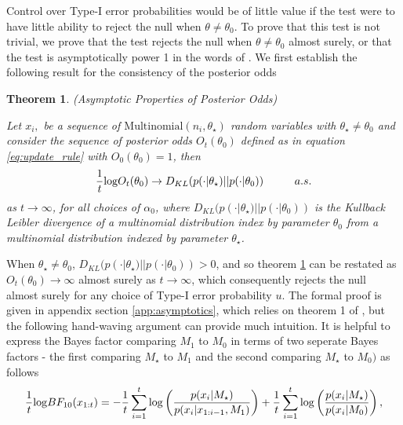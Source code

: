\documentclass[11pt]{article}
\def\log{{\rm log}}
\newtheorem{thm}{Theorem}[section]
\begin{document}
Control over Type-I error probabilities would be of little value if the test were to have little ability to reject the null when $\theta \neq \theta_0$.
To prove that this test is not trivial, we prove that the test rejects the null when $\theta \neq \theta_0$ almost surely, or that the test is asymptotically power 1 in the words of \cite{robbins}.
We first establish the following result for the consistency of the posterior odds

\begin{thm}(Asymptotic Properties of Posterior Odds)
  
  \label{thm:consistency}
\noindent Let $x_i,$ be a sequence of $\text{Multinomial}(n_i,\theta_{\star})$ random variables with $\theta_{\star} \neq \theta_0$ and consider the sequence of posterior odds $O_t(\theta_0)$ defined as in equation \eqref{eq:update_rule} with $O_0(\theta_0)=1$, then
\begin{equation}
  \label{eq:consistency}
  \frac{1}{t} \log O_t(\theta_0) \rightarrow D_{KL}(p(\cdot|\theta_{\star}) || p(\cdot|\theta_0)) \hspace{1cm} a.s.
\end{equation}
as $t \rightarrow \infty$, for all choices of $\alpha_0$, where $D_{KL}(p(\cdot|\theta_{\star}) || p(\cdot|\theta_0))$ is the Kullback Leibler divergence of a multinomial distribution index by parameter $\theta_0$ from a multinomial distribution indexed by parameter $\theta_{\star}$.

\end{thm}
\noindent When $\theta_{\star} \neq \theta_0$, $D_{KL}(p(\cdot|\theta_{\star}) || p(\cdot|\theta_0)) > 0$, and so theorem \ref{thm:consistency} can be restated as $O_t(\theta_0) \rightarrow \infty$ almost surely as $t \rightarrow \infty$, which consequently rejects the null almost surely for any choice of Type-I error probability $u$.
The formal proof is given in appendix section \ref{app:asymptotics}, which relies on theorem 1 of \cite{walker}, but the following hand-waving argument can provide much intuition.
It is helpful to express the Bayes factor comparing $M_1$ to $M_0$ in terms of two seperate Bayes factors - the first comparing $M_{\star}$ to $M_1$ and the second comparing $M_{\star}$ to $M_0)$ as follows
\begin{align*}
 \frac{1}{t} \log BF_{10}(x_{1:t}) = - \frac{1}{t}\sum_{i=1}^{t}\log \left( \frac{p(x_{i}|M_\star)}{p(x_{i}|x_{1:i-1},M_1)}\right) + \frac{1}{t}\sum_{i=1}^{t} \log  \left( \frac{p(x_{i}|M_\star)}{p(x_{i}|M_0)}\right),\\
\end{align*}
\end{document}
